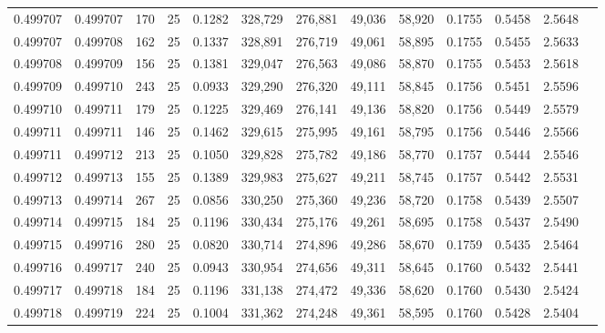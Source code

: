 \begin{tabular}{rrrrrrrrrrrrr}
0.499707 & 0.499707 & 170 &  25 &                                     0.1282 & 328,729 & 276,881 &  49,036 &  58,920 & 0.1755 & 0.5458 & 2.5648 \\
0.499707 & 0.499708 & 162 &  25 &                                     0.1337 & 328,891 & 276,719 &  49,061 &  58,895 & 0.1755 & 0.5455 & 2.5633 \\
0.499708 & 0.499709 & 156 &  25 &                                     0.1381 & 329,047 & 276,563 &  49,086 &  58,870 & 0.1755 & 0.5453 & 2.5618 \\
0.499709 & 0.499710 & 243 &  25 &                                     0.0933 & 329,290 & 276,320 &  49,111 &  58,845 & 0.1756 & 0.5451 & 2.5596 \\
0.499710 & 0.499711 & 179 &  25 &                                     0.1225 & 329,469 & 276,141 &  49,136 &  58,820 & 0.1756 & 0.5449 & 2.5579 \\
0.499711 & 0.499711 & 146 &  25 &                                     0.1462 & 329,615 & 275,995 &  49,161 &  58,795 & 0.1756 & 0.5446 & 2.5566 \\
0.499711 & 0.499712 & 213 &  25 &                                     0.1050 & 329,828 & 275,782 &  49,186 &  58,770 & 0.1757 & 0.5444 & 2.5546 \\
0.499712 & 0.499713 & 155 &  25 &                                     0.1389 & 329,983 & 275,627 &  49,211 &  58,745 & 0.1757 & 0.5442 & 2.5531 \\
0.499713 & 0.499714 & 267 &  25 &                                     0.0856 & 330,250 & 275,360 &  49,236 &  58,720 & 0.1758 & 0.5439 & 2.5507 \\
0.499714 & 0.499715 & 184 &  25 &                                     0.1196 & 330,434 & 275,176 &  49,261 &  58,695 & 0.1758 & 0.5437 & 2.5490 \\
0.499715 & 0.499716 & 280 &  25 &                                     0.0820 & 330,714 & 274,896 &  49,286 &  58,670 & 0.1759 & 0.5435 & 2.5464 \\
0.499716 & 0.499717 & 240 &  25 &                                     0.0943 & 330,954 & 274,656 &  49,311 &  58,645 & 0.1760 & 0.5432 & 2.5441 \\
0.499717 & 0.499718 & 184 &  25 &                                     0.1196 & 331,138 & 274,472 &  49,336 &  58,620 & 0.1760 & 0.5430 & 2.5424 \\
0.499718 & 0.499719 & 224 &  25 &                                     0.1004 & 331,362 & 274,248 &  49,361 &  58,595 & 0.1760 & 0.5428 & 2.5404 \\

\end{tabular}
